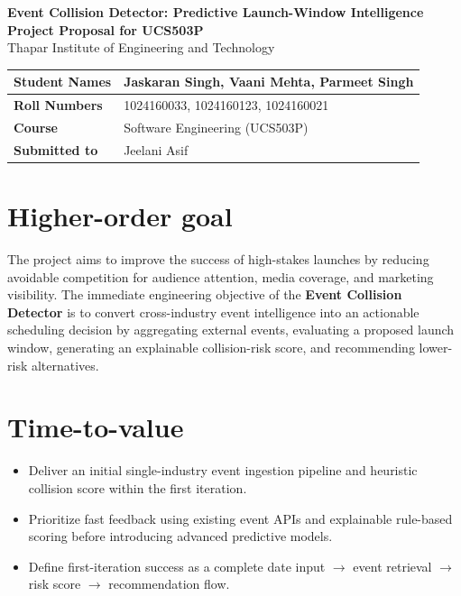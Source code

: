 \documentclass[12pt]{article}
\begin{document}
\begin{center}
\LARGE\textbf{Event Collision Detector: Predictive Launch-Window Intelligence}\\
\vspace{0.5em}
\Large\textbf{Project Proposal for UCS503P}\\
\vspace{0.5em}
\large Thapar Institute of Engineering and Technology
\end{center}

\vspace{1.5em}
\renewcommand{\arraystretch}{1.5}
\noindent
\begin{tabularx}{\textwidth}{|l|X|}
\hline
\textbf{Student Names} & Jaskaran Singh, Vaani Mehta, Parmeet Singh \\
\hline
\textbf{Roll Numbers} & 1024160033, 1024160123, 1024160021 \\
\hline
\textbf{Course} & Software Engineering (UCS503P) \\
\hline
\textbf{Submitted to} & Jeelani Asif \\
\hline
\end{tabularx}

\section{Higher-order goal}
The project aims to improve the success of high-stakes launches by reducing avoidable competition for audience attention, media coverage, and marketing visibility. The immediate engineering objective of the \textbf{Event Collision Detector} is to convert cross-industry event intelligence into an actionable scheduling decision by aggregating external events, evaluating a proposed launch window, generating an explainable collision-risk score, and recommending lower-risk alternatives.

\section{Time-to-value}
\begin{itemize}[leftmargin=0.7cm]
\item Deliver an initial single-industry event ingestion pipeline and heuristic collision score within the first iteration.
\item Prioritize fast feedback using existing event APIs and explainable rule-based scoring before introducing advanced predictive models.
\item Define first-iteration success as a complete date input $\rightarrow$ event retrieval $\rightarrow$ risk score $\rightarrow$ recommendation flow.
\end{itemize}
\end{document}
